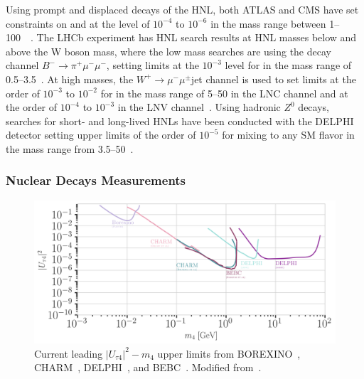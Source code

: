 Using prompt and displaced decays of the HNL, both ATLAS and CMS have set constraints on  and  at the level of $10^{-4}$ to $10^{-6}$ in the mass range between \SIrange{1}{100}{\gev}~~\cite{ATLAS:2019kpx, CMS:2018iaf}. The LHCb experiment has HNL search results at HNL masses below and above the W boson mass, where the low mass searches are using the decay channel $B^- \rightarrow \pi^+ \mu^- \mu^-$, setting limits at the $10^{-3}$ level for  in the mass range of \SIrange{0.5}{3.5}{\gev}~. At high masses, the $W^+ \rightarrow \mu^- \mu^\pm$jet channel is used to set limits at the order of $10^{-3}$ to $10^{-2}$ for  in the mass range of \SIrange{5}{50}{\gev} in the LNC channel and at the order of $10^{-4}$ to $10^{-3}$ in the LNV channel~. Using hadronic $Z^0$ decays, searches for short- and long-lived HNLs have been conducted with the DELPHI detector setting upper limits of the order of $10^{-5}$ for mixing to any SM flavor in the mass range from \SIrange{3.5}{50}{\gev}~. 


\subsubsection{Nuclear Decays Measurements}

\begin{figure}[t]
    \includegraphics{figures/hnl_simulation/theory/UtauN_majorana.png}
      \caption[Current leading $|U_{\tau4}|^2-m_4$ upper limits]{Current leading $|U_{\tau4}|^2-m_4$ upper limits from BOREXINO~\cite{Plestid:2020vqf}, CHARM~\cite{Orloff:2002de, Boiarska:2021yho}, DELPHI~\cite{DELPHI:1996qcc}, and BEBC~\cite{Barouki:2022bkt}. Modified from~\cite{hoster_limitFernandez-Martinez:2023phj}.}
\end{figure}

